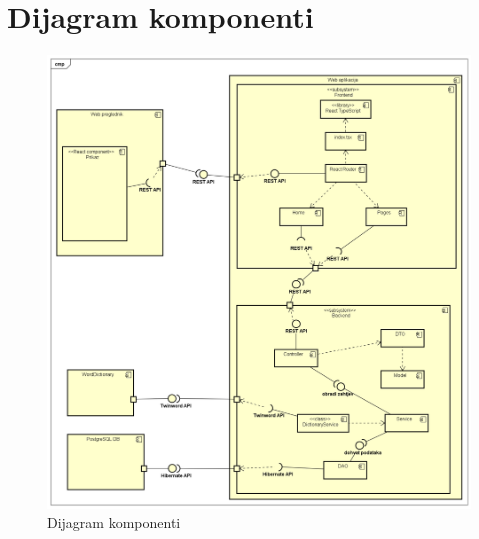 			\eject
		\section{Dijagram komponenti}
		
		
			 
			 \begin{figure}[H]
			 	\includegraphics[width=\textwidth]{slike/ComponentDiagram.PNG}
			 	\caption{Dijagram komponenti}
			 	\label{fig:componentDiagram}
			 \end{figure}
			 
			 \newpage
			 
